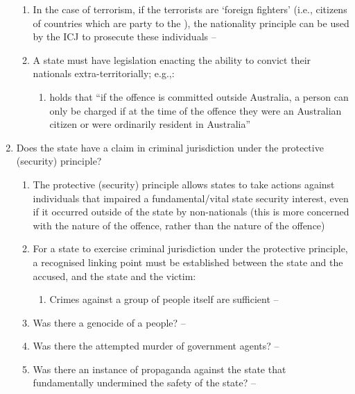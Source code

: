 \begin{enumerate}
\begin{enumerate}
        \item In the case of terrorism, if the terrorists are `foreign fighters' (i.e., citizens of countries which are party to the ), the nationality principle can be used by the ICJ to prosecute these individuals -- 
        \item A state must have legislation enacting the ability to convict their nationals extra-territorially; e.g.,:
        \begin{enumerate}
            \item {} holds that ``if the offence is committed outside Australia, a person can only be charged if at the time of the offence they were an Australian citizen or were ordinarily resident in Australia''
        \end{enumerate}
    \end{enumerate}
    \item Does the state have a claim in criminal jurisdiction under the protective (security) principle?
    \begin{enumerate}
        \item The protective (security) principle allows states to take actions against individuals that impaired a fundamental/vital state security interest, even if it occurred outside of the state by non-nationals (this is more concerned with the nature of the offence, rather than the nature of the offence)
        \item For a state to exercise criminal jurisdiction under the protective principle, a recognised linking point must be established between the state and the accused, and the state and the victim:
        \begin{enumerate}
            \item Crimes against a group of people itself are sufficient -- 
        \end{enumerate}
        \item Was there a genocide of a people? -- 
        \item Was there the attempted murder of government agents? -- 
        \item Was there an instance of propaganda against the state that fundamentally undermined the safety of the state? -- 

\end{enumerate}
\end{enumerate}
